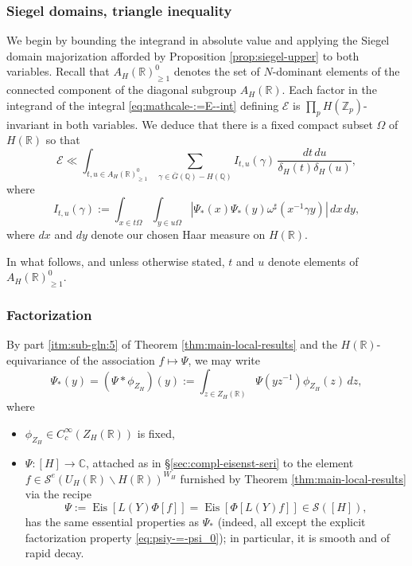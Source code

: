 \documentclass[reqno]{amsart}
\DeclareMathOperator{\Eis}{Eis}
\theoremstyle{plain} \newtheorem{theorem} {Theorem}
\theoremstyle{definition} \newtheorem{definition} [theorem] {Definition}
\theoremstyle{itplain} %
\numberwithin{equation}{section}
\numberwithin{theorem}{section}
\renewcommand{\geq}{\geqslant}
\begin{document}
\subsubsection{Siegel domains, triangle inequality}
We begin by bounding the integrand in absolute value and applying the Siegel domain majorization afforded by Proposition \ref{prop:siegel-upper} to both variables.  Recall that $A_H(\mathbb{R})^0_{\geq 1}$ denotes the set of $N$-dominant elements of the connected component of the diagonal subgroup $A_H(\mathbb{R})$.  Each factor in the integrand of the integral \eqref{eq:mathcale-:=E--int} defining $\mathcal{E}$  is $\prod_{p} H(\mathbb{Z}_p)$-invariant in both variables.  We deduce that there is a fixed compact subset $\Omega$ of $H(\mathbb{R})$ so that
\begin{equation}\label{eq:mathcale-ll-int}
  \mathcal{E} \ll \int _{t, u \in A_H(\mathbb{R})^0_{\geq 1} } \sum_{\gamma \in \bar{G}(\mathbb{Q}) - H(\mathbb{Q})} I_{t, u}(\gamma)  
  \, \frac{d t \, d u}{\delta_H(t) \delta_H(u)},
\end{equation}
where
\begin{equation*}
  I_{t,u}(\gamma) :=
  \int _{x \in t \Omega}
  \int _{y \in u \Omega}
  \left\lvert \Psi_{\ast}(x) \Psi_{\ast}(y)
    \omega^\sharp (x ^{-1} \gamma y)
  \right\rvert
  \,d x \,d y,
\end{equation*}
where $d x$ and $d y$ denote our chosen Haar measure on $H(\mathbb{R})$.

In what follows, and unless otherwise stated, $t$ and $u$ denote elements of $A_H(\mathbb{R})^0_{\geq 1}$.

\subsubsection{Factorization}
By part \eqref{itm:sub-gln:5} of Theorem \ref{thm:main-local-results} and the $H(\mathbb{R})$-equivariance of the association $f \mapsto \Psi$, we may write
\begin{equation}\label{eq:psiy-=-psi_0}
\Psi_{\ast}(y) = (\Psi \ast \phi_{Z_H})(y) := \int _{z \in Z_H(\mathbb{R})} \Psi(y z ^{-1}) \phi_{Z_H}(z) \, d z,
\end{equation}
where
\begin{itemize}
\item $\phi_{Z_H} \in C_c^\infty(Z_H(\mathbb{R}))$ is fixed, 
\item $\Psi : [H] \rightarrow \mathbb{C}$, attached as in \S\ref{sec:compl-eisenst-seri} to the element $f \in \mathcal{S}^e(U_H(\mathbb{R}) \backslash H(\mathbb{R}))^{W_H}$ furnished by Theorem \ref{thm:main-local-results} via the recipe
    \begin{equation*}
      \Psi := \Eis[L(Y) \Phi[f]] = \Eis[\Phi[L(Y) f]] \in \mathcal{S}([H]),
    \end{equation*}
  has the same essential properties as $\Psi_{\ast}$ (indeed, all except the explicit factorization property \eqref{eq:psiy-=-psi_0}); in particular, it is smooth and of rapid decay.
\end{itemize}
\end{document}
